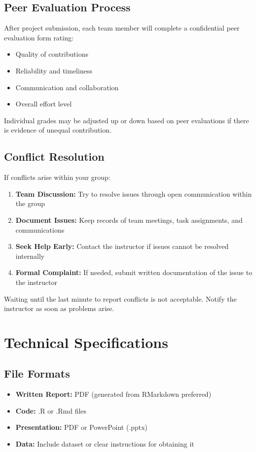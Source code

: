 \documentclass[11pt]{article}
\begin{document}
\subsection{Peer Evaluation Process}

After project submission, each team member will complete a confidential peer evaluation form rating:
\begin{itemize}
\item Quality of contributions
\item Reliability and timeliness
\item Communication and collaboration
\item Overall effort level
\end{itemize}

Individual grades may be adjusted up or down based on peer evaluations if there is evidence of unequal contribution.

\subsection{Conflict Resolution}

If conflicts arise within your group:

\begin{enumerate}
\item \textbf{Team Discussion:} Try to resolve issues through open communication within the group
\item \textbf{Document Issues:} Keep records of team meetings, task assignments, and communications
\item \textbf{Seek Help Early:} Contact the instructor if issues cannot be resolved internally
\item \textbf{Formal Complaint:} If needed, submit written documentation of the issue to the instructor
\end{enumerate}

Waiting until the last minute to report conflicts is not acceptable. Notify the instructor as soon as problems arise.

\section{Technical Specifications}

\subsection{File Formats}

\begin{itemize}
\item \textbf{Written Report:} PDF (generated from RMarkdown preferred)
\item \textbf{Code:} .R or .Rmd files
\item \textbf{Presentation:} PDF or PowerPoint (.pptx)
\item \textbf{Data:} Include dataset or clear instructions for obtaining it
\end{itemize}
\end{document}
